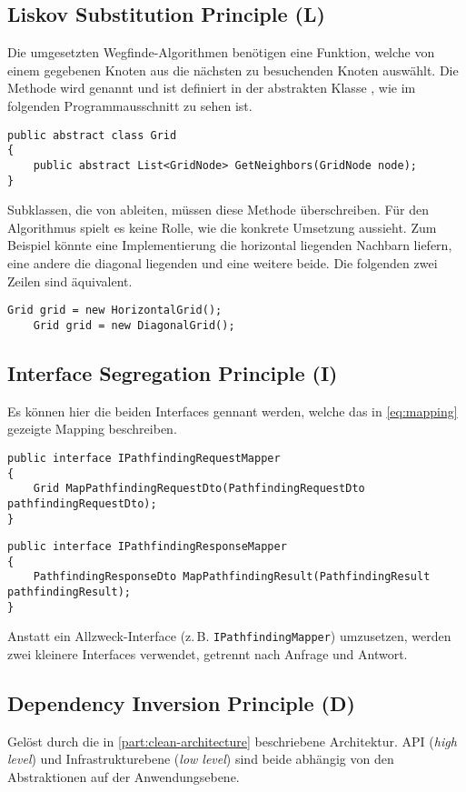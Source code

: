 \subsection{Liskov Substitution Principle (L)} \label{sec:lsp}
Die umgesetzten Wegfinde-Algorithmen benötigen eine
Funktion, welche von einem gegebenen Knoten aus die nächsten zu besuchenden
Knoten auswählt. Die Methode wird 
genannt und ist definiert in der abstrakten Klasse ,
wie im folgenden Programmausschnitt zu sehen ist.
\begin{lstlisting}[caption={\textbf{Grid} Entität},label={code:grid-entity}]
public abstract class Grid
{
    public abstract List<GridNode> GetNeighbors(GridNode node);
}
\end{lstlisting}
Subklassen, die von  ableiten, müssen diese Methode überschreiben.
Für den Algorithmus spielt es keine Rolle, wie die konkrete Umsetzung aussieht.
Zum Beispiel könnte eine Implementierung die horizontal liegenden Nachbarn liefern,
eine andere die diagonal liegenden und eine weitere beide. Die folgenden zwei Zeilen sind äquivalent.
\begin{lstlisting}[caption={Abstraktion des Gitters}]
    Grid grid = new HorizontalGrid();
    Grid grid = new DiagonalGrid();
\end{lstlisting}

\newpage

\subsection{Interface Segregation Principle (I)}
Es können hier die beiden Interfaces gennant werden, welche das in \autoref{eq:mapping}
gezeigte Mapping beschreiben.
\begin{lstlisting}[caption={Request Mapper}]
public interface IPathfindingRequestMapper
{
    Grid MapPathfindingRequestDto(PathfindingRequestDto pathfindingRequestDto);
}
\end{lstlisting}
\begin{lstlisting}[caption={Response Mapper}]
public interface IPathfindingResponseMapper
{
    PathfindingResponseDto MapPathfindingResult(PathfindingResult pathfindingResult);
}
\end{lstlisting}
Anstatt ein Allzweck-Interface (z.\,B. \lstinline{IPathfindingMapper}) umzusetzen,
werden zwei kleinere Interfaces verwendet, getrennt nach Anfrage und Antwort.

\subsection{Dependency Inversion Principle (D)}
Gelöst durch die in \autoref{part:clean-architecture} beschriebene Architektur.
API (\textit{high level}) und Infrastrukturebene (\textit{low level})
sind beide abhängig von den Abstraktionen auf der Anwendungsebene.

